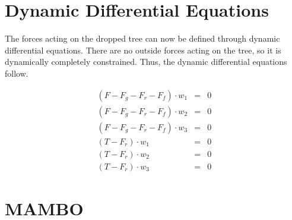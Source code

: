 \documentclass{article}
\begin{document}
\section{Dynamic Differential Equations} %
The forces acting on the dropped tree can now be defined through dynamic differential equations. There are no outside forces acting on the tree, so it is dynamically completely constrained. Thus, the dynamic differential equations follow.

\begin{eqnarray*}
\left(F - F_g - F_r - F_f\right) \cdot w_1 & = & 0 \\
\left(F - F_g - F_r - F_f\right) \cdot w_2 & = & 0 \\
\left(F - F_g - F_r - F_f\right) \cdot w_3 & = & 0 \\
\left(T - F_r\right) \cdot w_1 & = & 0 \\
\left(T - F_r\right) \cdot w_2 & = & 0 \\
\left(T - F_r\right) \cdot w_3 & = & 0
\end{eqnarray*}

\section{MAMBO} %
\end{document}
